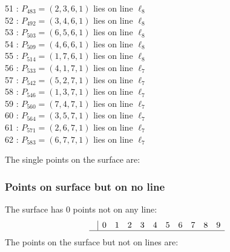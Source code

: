 \documentclass{article}
\begin{document}
{\begin{multicols}{2}
51 : $P_{483}=( 2, 3, 6, 1 )$ lies on line $\ell_{8}$\\
52 : $P_{492}=( 3, 4, 6, 1 )$ lies on line $\ell_{8}$\\
53 : $P_{503}=( 6, 5, 6, 1 )$ lies on line $\ell_{8}$\\
54 : $P_{509}=( 4, 6, 6, 1 )$ lies on line $\ell_{8}$\\
55 : $P_{514}=( 1, 7, 6, 1 )$ lies on line $\ell_{8}$\\
56 : $P_{533}=( 4, 1, 7, 1 )$ lies on line $\ell_{7}$\\
57 : $P_{542}=( 5, 2, 7, 1 )$ lies on line $\ell_{7}$\\
58 : $P_{546}=( 1, 3, 7, 1 )$ lies on line $\ell_{7}$\\
59 : $P_{560}=( 7, 4, 7, 1 )$ lies on line $\ell_{7}$\\
60 : $P_{564}=( 3, 5, 7, 1 )$ lies on line $\ell_{7}$\\
61 : $P_{571}=( 2, 6, 7, 1 )$ lies on line $\ell_{7}$\\
62 : $P_{583}=( 6, 7, 7, 1 )$ lies on line $\ell_{7}$\\
\end{multicols}
The single points on the surface are:\\
\subsubsection*{Points on surface but on no line}
The surface has 0 points not on any line:\\
$$
\begin{array}{r|*{10}{r}}
 & 0 & 1 & 2 & 3 & 4 & 5 & 6 & 7 & 8 & 9\\
\hline
\end{array}
$$
The points on the surface but not on lines are:\\
\begin{multicols}{2}
\noindent
\end{multicols}
}
\end{document}
